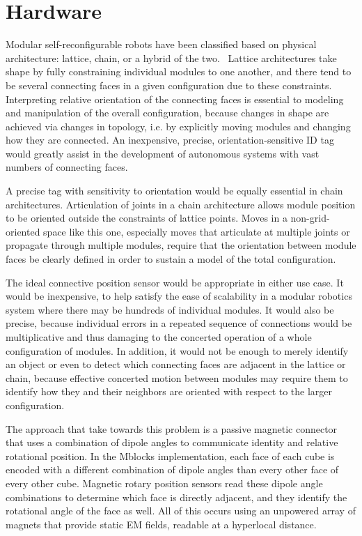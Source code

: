 \section{Hardware}
\label{sec:Hardware}




Modular self-reconfigurable robots have been classified based on physical architecture: lattice, chain, or a hybrid of the two.~\cite{Yim-RAM07}\cite{Moubarak2012}\cite{surveyyim} Lattice architectures take shape by fully constraining individual modules to one another, and there tend to be several connecting faces in a given configuration due to these constraints. Interpreting relative orientation of the connecting faces is essential to modeling and manipulation of the overall configuration, because changes in shape are achieved via changes in topology, i.e. by explicitly moving modules and changing how they are connected. An inexpensive, precise, orientation-sensitive ID tag would greatly assist in the development of autonomous systems with vast numbers of connecting faces.

A precise tag with sensitivity to orientation would be equally essential in chain architectures. Articulation of joints in a chain architecture allows module position to be oriented outside the constraints of lattice points. Moves in a non-grid-oriented space like this one, especially moves that articulate at multiple joints or propagate through multiple modules, require that the orientation between module faces be clearly defined in order to sustain a model of the total configuration.

The ideal connective position sensor would be appropriate in either use case. It would be inexpensive, to help satisfy the ease of scalability in a modular robotics system where there may be hundreds of individual modules. It would also be precise, because individual errors in a repeated sequence of connections would be multiplicative and thus damaging to the concerted operation of a whole configuration of modules. In addition, it would not be enough to merely identify an object or even to detect which connecting faces are adjacent in the lattice or chain, because effective concerted motion between modules may require them to identify how they and their neighbors are oriented with respect to the larger configuration.

The approach that \tagNamePlural take towards this problem is a passive magnetic connector that uses a combination of dipole angles to communicate identity and relative rotational position. In the Mblocks implementation, each face of each cube is encoded with a different combination of dipole angles than every other face of every other cube. Magnetic rotary position sensors read these dipole angle combinations to determine which face is directly adjacent, and they identify the rotational angle of the face as well. All of this occurs using an unpowered array of magnets that provide static EM fields, readable at a hyperlocal distance.

